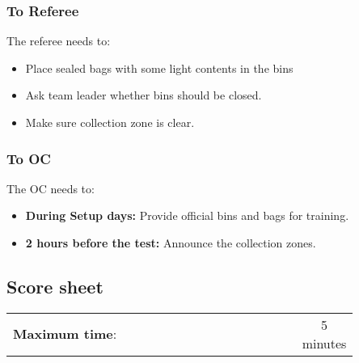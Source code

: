 \subsubsection*{To Referee}

The referee needs to:
\begin{itemize}
	\item Place sealed bags with some light contents in the bins
	\item Ask team leader whether bins should be closed.
	\item Make sure collection zone is clear.
\end{itemize}

\subsubsection*{To OC}
The OC needs to:
\begin{itemize}[nosep]
	\item \textbf{During Setup days:} Provide official bins and bags for training.
	\item \textbf{2 hours before the test:} Announce the collection zones.
\end{itemize}

\subsection*{Score sheet}
\begin{table}[h]
	\begin{tabular}{m{0.85\linewidth} c}
		\textbf{Maximum time}: & 5 minutes \\
	\end{tabular}
\end{table}

\small\begin{scorelist}
\end{scorelist}

\clearpage
